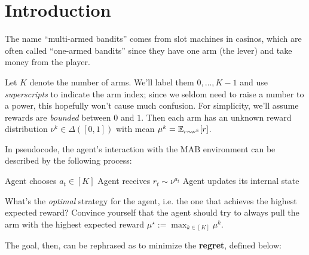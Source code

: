 \documentclass[\main/main]{subfiles}
\begin{document}
\section{Introduction}

The name ``multi-armed bandits'' comes from slot machines in casinos, which are often called ``one-armed bandits'' since they have one arm (the lever) and take money from the player.

Let $K$ denote the number of arms. We'll label them $0, \dots, K-1$ and use \emph{superscripts} to indicate the arm index; since we seldom need to raise a number to a power, this hopefully won't cause much confusion. For simplicity, we'll assume rewards are \emph{bounded} between $0$ and $1$. Then each arm has an unknown reward distribution $\nu^k \in \Delta([0, 1])$ with mean $\mu^k = \operatorname*{\mathbb{E}}_{r \sim \nu^k} [r]$.

In pseudocode, the agent's interaction with the MAB environment can be described by the following process:

\begin{algorithmic}
    \State Agent chooses $a_t \in [K]$
    \State Agent receives $r_t \sim \nu^{a_t}$
    \State Agent updates its internal state
    \EndFor
\end{algorithmic}

What's the \emph{optimal} strategy for the agent, i.e. the one that achieves the highest expected reward? Convince yourself that the agent should try to always pull the arm with the highest expected reward $\mu^\star := \max_{k \in [K]} \mu^k$.

The goal, then, can be rephrased as to minimize the \textbf{regret}, defined below:
\end{document}
